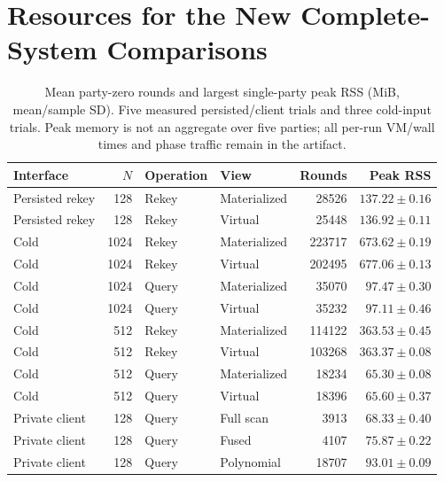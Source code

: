 \section{Resources for the New Complete-System Comparisons}\label{suppsec:generated_v3_supplement:4}
\begin{table}[t]
\caption{Mean party-zero rounds and largest single-party peak RSS (MiB, mean/sample SD). Five measured persisted/client trials and three cold-input trials. Peak memory is not an aggregate over five parties; all per-run VM/wall times and phase traffic remain in the artifact.}
\label{tab:v3resources}\centering\small
\setlength{\tabcolsep}{3pt}
\begin{tabular}{lrllrr}
\toprule
Interface & $N$ & Operation & View & Rounds & Peak RSS \\
\midrule
Persisted rekey & 128 & Rekey & Materialized & 28526 & $137.22\pm0.16$ \\
Persisted rekey & 128 & Rekey & Virtual & 25448 & $136.92\pm0.11$ \\
Cold & 1024 & Rekey & Materialized & 223717 & $673.62\pm0.19$ \\
Cold & 1024 & Rekey & Virtual & 202495 & $677.06\pm0.13$ \\
Cold & 1024 & Query & Materialized & 35070 & $97.47\pm0.30$ \\
Cold & 1024 & Query & Virtual & 35232 & $97.11\pm0.46$ \\
Cold & 512 & Rekey & Materialized & 114122 & $363.53\pm0.45$ \\
Cold & 512 & Rekey & Virtual & 103268 & $363.37\pm0.08$ \\
Cold & 512 & Query & Materialized & 18234 & $65.30\pm0.08$ \\
Cold & 512 & Query & Virtual & 18396 & $65.60\pm0.37$ \\
Private client & 128 & Query & Full scan & 3913 & $68.33\pm0.40$ \\
Private client & 128 & Query & Fused & 4107 & $75.87\pm0.22$ \\
Private client & 128 & Query & Polynomial & 18707 & $93.01\pm0.09$ \\
\bottomrule
\end{tabular}
\end{table}


